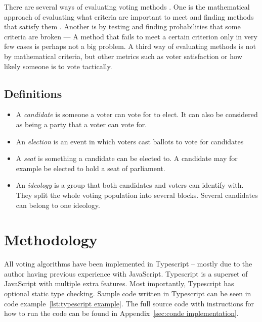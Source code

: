 \documentclass[12pt]{article}
\begin{document}
There are several ways of evaluating voting methods \autocite{green-armytageND}. One is the mathematical approach of evaluating what criteria are important to meet and finding methods that satisfy them \autocite{woodwall1994}. Another is by testing and finding probabilities that some criteria are broken — A method that fails to meet a certain criterion only in very few cases is perhaps not a big problem. A third way of evaluating methods is not by mathematical criteria, but other metrics such as voter satisfaction or how likely someone is to vote tactically.
\subsection{Definitions}
\begin{itemize}
	\item A \textit{candidate} is someone a voter can vote for to elect. It can also be considered as being a party that a voter can vote for.
	\item An \textit{election} is an event in which voters cast ballots to vote for candidates
	\item A \textit{seat} is something a candidate can be elected to. A candidate may for example be elected to hold a seat of parliament.
	\item An \textit{ideology} is a group that both candidates and voters can identify with. They split the whole voting population into several blocks. Several candidates can belong to one ideology.
\end{itemize}  
\pagebreak
\section{Methodology}
All voting algorithms have been implemented in Typescript – mostly due to the author having previous experience with JavaScript. Typescript is a superset of JavaScript with multiple extra features. Most importantly, Typescript has optional static type checking. Sample code written in Typescript can be seen in code example~\ref{lst:typescript example}. The full source code with instructions for how to run the code can be found in Appendix~\ref{sec:conde implementation}.
\end{document}
